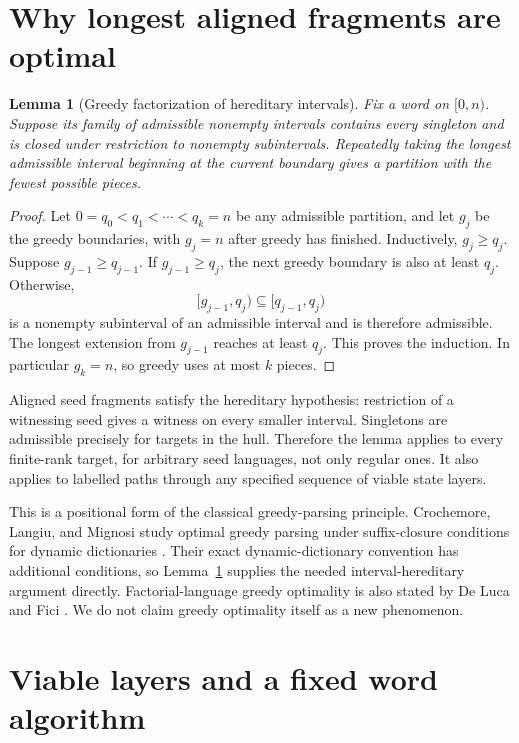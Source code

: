 \documentclass[11pt,letterpaper]{article}
\newtheorem{lemma}[theorem]{Lemma}
\theoremstyle{definition}
\theoremstyle{remark}
\begin{document}
\section{Why longest aligned fragments are optimal}\label{ccc:rs:sec:greedy}

\begin{lemma}[Greedy factorization of hereditary intervals]\label{ccc:rs:lem:greedy}
Fix a word on $[0,n)$. Suppose its family of admissible nonempty intervals contains every singleton and is closed under restriction to nonempty subintervals. Repeatedly taking the longest admissible interval beginning at the current boundary gives a partition with the fewest possible pieces.
\end{lemma}
\begin{proof}
Let $0=q_0<q_1<\cdots<q_k=n$ be any admissible partition, and let $g_j$ be the greedy boundaries, with $g_j=n$ after greedy has finished. Inductively, $g_j\ge q_j$. Suppose $g_{j-1}\ge q_{j-1}$. If $g_{j-1}\ge q_j$, the next greedy boundary is also at least $q_j$. Otherwise,
\[
[g_{j-1},q_j)\subseteq[q_{j-1},q_j)
\]
is a nonempty subinterval of an admissible interval and is therefore admissible. The longest extension from $g_{j-1}$ reaches at least $q_j$. This proves the induction. In particular $g_k=n$, so greedy uses at most $k$ pieces.
\end{proof}

Aligned seed fragments satisfy the hereditary hypothesis: restriction of a witnessing seed gives a witness on every smaller interval. Singletons are admissible precisely for targets in the hull. Therefore the lemma applies to every finite-rank target, for arbitrary seed languages, not only regular ones. It also applies to labelled paths through any specified sequence of viable state layers.

This is a positional form of the classical greedy-parsing principle. Crochemore, Langiu, and Mignosi study optimal greedy parsing under suffix-closure conditions for dynamic dictionaries \cite{CLM}. Their exact dynamic-dictionary convention has additional conditions, so Lemma~\ref{ccc:rs:lem:greedy} supplies the needed interval-hereditary argument directly. Factorial-language greedy optimality is also stated by De Luca and Fici \cite{DeLucaFici}. We do not claim greedy optimality itself as a new phenomenon.

\section{Viable layers and a fixed word algorithm}\label{ccc:rs:sec:parser}
\end{document}
